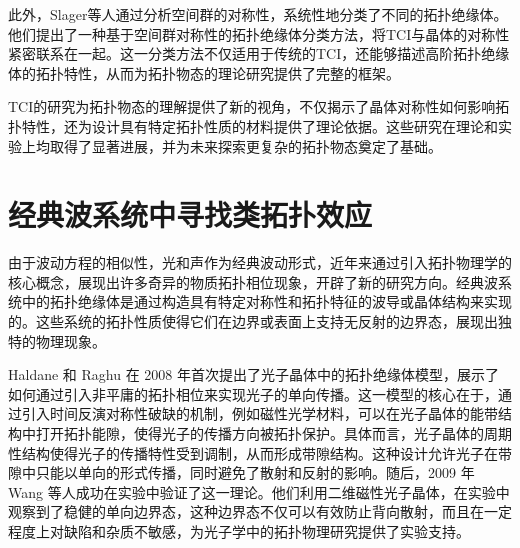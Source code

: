 此外，Slager等人通过分析空间群的对称性，系统性地分类了不同的拓扑绝缘体\cite{f5}。他们提出了一种基于空间群对称性的拓扑绝缘体分类方法，将TCI与晶体的对称性紧密联系在一起。这一分类方法不仅适用于传统的TCI，还能够描述高阶拓扑绝缘体的拓扑特性，从而为拓扑物态的理论研究提供了完整的框架。

TCI的研究为拓扑物态的理解提供了新的视角，不仅揭示了晶体对称性如何影响拓扑特性，还为设计具有特定拓扑性质的材料提供了理论依据。这些研究在理论和实验上均取得了显著进展，并为未来探索更复杂的拓扑物态奠定了基础。 


\section{经典波系统中寻找类拓扑效应}

由于波动方程的相似性，光和声作为经典波动形式，近年来通过引入拓扑物理学的核心概念，展现出许多奇异的物质拓扑相位现象，开辟了新的研究方向。经典波系统中的拓扑绝缘体是通过构造具有特定对称性和拓扑特征的波导或晶体结构来实现的。这些系统的拓扑性质使得它们在边界或表面上支持无反射的边界态，展现出独特的物理现象。

Haldane 和 Raghu 在 2008 年首次提出了光子晶体中的拓扑绝缘体模型\cite{g1}，展示了如何通过引入非平庸的拓扑相位来实现光子的单向传播。这一模型的核心在于，通过引入时间反演对称性破缺的机制，例如磁性光学材料，可以在光子晶体的能带结构中打开拓扑能隙，使得光子的传播方向被拓扑保护。具体而言，光子晶体的周期性结构使得光子的传播特性受到调制，从而形成带隙结构。这种设计允许光子在带隙中只能以单向的形式传播，同时避免了散射和反射的影响。随后，2009 年 Wang 等人成功在实验中验证了这一理论\cite{g2}。他们利用二维磁性光子晶体，在实验中观察到了稳健的单向边界态，这种边界态不仅可以有效防止背向散射，而且在一定程度上对缺陷和杂质不敏感，为光子学中的拓扑物理研究提供了实验支持。


